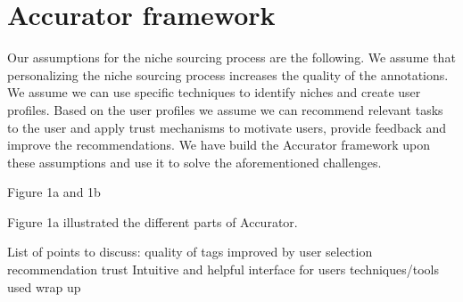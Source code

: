 \section{Accurator framework}
\label{architecture}
Our assumptions for the niche sourcing process are the following. We assume that personalizing the niche sourcing process increases the quality of the annotations. We assume we can use specific techniques to identify niches and create user profiles. Based on the user profiles we assume we can recommend relevant tasks to the user and apply trust mechanisms to motivate users, provide feedback and improve the recommendations.  We have build the Accurator framework upon these assumptions and use it to solve the aforementioned challenges. 

Figure 1a and 1b

Figure 1a illustrated the different parts of Accurator. 

List of points to discuss:
quality of tags improved by
user selection
recommendation
trust
Intuitive and helpful interface for users 
techniques/tools used
wrap up


